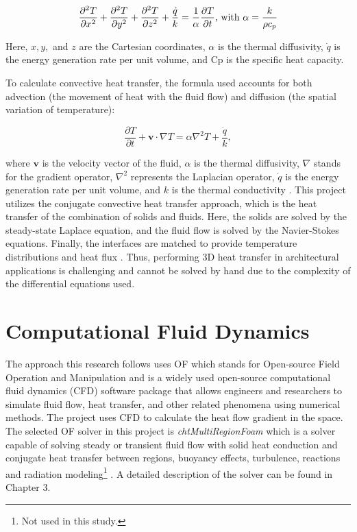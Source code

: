 	\begin{equation} 
	\frac{\partial^2 T}{\partial x^2}+
	\frac{\partial^2 T}{\partial y^2}+
	\frac{\partial^2 T}{\partial z^2}+ 
	\frac{\dot{q}}{k}= \frac{1}{\alpha}\frac{\partial T}{\partial t} \text{, with } \alpha = \frac{k}{\rho c_p}\quad \\
	\end{equation}
	
	
Here, $x,y,$ and $z$ are the Cartesian coordinates, $\alpha$ is the thermal diffusivity, $\dot{q}$ is the energy generation rate per unit volume, and \gls{Cp} is the specific heat capacity.
 
To calculate convective heat transfer, the formula used accounts for both advection (the movement of heat with the fluid flow) and diffusion (the spatial variation of temperature): 

\begin{equation}
    \frac{\partial T}{\partial t} + \mathbf{v} \cdot \nabla T = \alpha \nabla^2 T + \frac{\dot{q}}{k},
\end{equation}

where $\mathbf{v}$ is the velocity vector of the fluid, $\alpha$ is the thermal diffusivity, $\nabla$ stands for the gradient operator, $\nabla^2$ represents the Laplacian operator, $\dot{q}$ is the energy generation rate per unit volume, and $k$ is the thermal conductivity \cite{bergman2011fundamentals}. This project utilizes the conjugate convective heat transfer approach, which is the heat transfer of the combination of solids and fluids. Here, the solids are solved by the steady-state Laplace equation, and the fluid flow is solved by the Navier-Stokes equations. Finally, the interfaces are matched to provide temperature distributions and heat flux \cite{Zhao2007}. Thus, performing 3D heat transfer in architectural applications is challenging and cannot be solved by hand due to the complexity of the differential equations used.



\section{Computational Fluid Dynamics}
The approach this research follows uses \gls{OF} which stands for Open-source Field Operation and Manipulation and is a widely used open-source computational fluid dynamics  (CFD) software package that allows engineers and researchers to simulate fluid flow, heat transfer, and other related phenomena using numerical methods. The project uses CFD to calculate the heat flow gradient in the space. The selected \gls{OF} solver in this project is \textit{\gls{cht}MultiRegionFoam} which is a solver capable of solving steady or transient fluid flow with solid heat conduction and conjugate heat transfer between regions, buoyancy effects, turbulence, reactions and radiation modeling\footnote{Not used in this study.} \cite{cht}. A detailed description of the solver can be found in Chapter 3.


